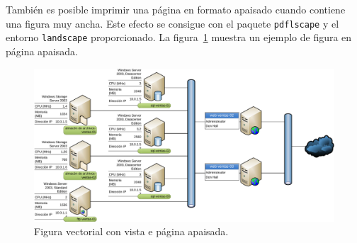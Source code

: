 \documentclass[11pt,a4paper]{article}
\begin{document}
\begin{landscape}
También es posible imprimir una página en formato apaisado cuando contiene una figura muy ancha. Este efecto se consigue con el paquete \texttt{pdflscape} y el entorno \texttt{landscape} proporcionado. La figura~\ref{fig:apaisada} muestra un ejemplo de figura en página apaisada.
\begin{figure}[H]
	\centering
	\includegraphics[width=0.98\linewidth]{network} 
	\caption[Gráfico apaisado de Visio]{Figura vectorial con vista e página apaisada.}
	\label{fig:apaisada}
\end{figure}
\end{landscape}
\end{document}
